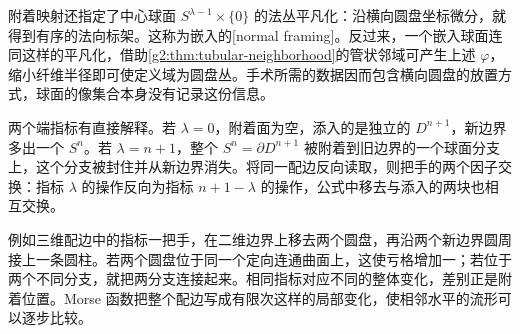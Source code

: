 附着映射还指定了中心球面 \(S^{\lambda-1}\times\{0\}\) 的法丛平凡化：沿横向圆盘坐标微分，就得到有序的法向标架。这称为嵌入的[normal framing]。反过来，一个嵌入球面连同这样的平凡化，借助\cref{g2:thm:tubular-neighborhood}的管状邻域可产生上述 \(\varphi\)，缩小纤维半径即可使定义域为圆盘丛。手术所需的数据因而包含横向圆盘的放置方式，球面的像集合本身没有记录这份信息。

\ProseParagraphBreak

两个端指标有直接解释。若 \(\lambda=0\)，附着面为空，添入的是独立的 \(D^{n+1}\)，新边界多出一个 \(S^n\)。若 \(\lambda=n+1\)，整个 \(S^n=\partial D^{n+1}\) 被附着到旧边界的一个球面分支上，这个分支被封住并从新边界消失。将同一配边反向读取，则把手的两个因子交换：指标 \(\lambda\) 的操作反向为指标 \(n+1-\lambda\) 的操作，公式中移去与添入的两块也相互交换。

\ProseParagraphBreak

例如三维配边中的指标一把手，在二维边界上移去两个圆盘，再沿两个新边界圆周接上一条圆柱。若两个圆盘位于同一个定向连通曲面上，这使亏格增加一；若位于两个不同分支，就把两分支连接起来。相同指标对应不同的整体变化，差别正是附着位置。Morse 函数把整个配边写成有限次这样的局部变化，使相邻水平的流形可以逐步比较。
